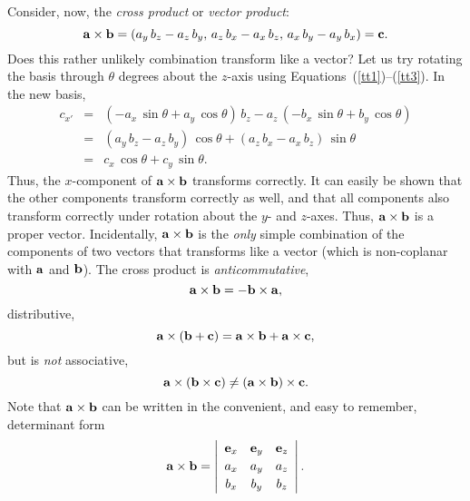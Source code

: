 Consider, now, the {\em cross product} or {\em vector product}:
\begin{equation}
{\bf a}\times{\bf b} = (a_y \, b_z-a_z\, b_y,\, a_z\, b_x - a_x\, b_z,\, a_x\, b_y - a_y\, b_x)
={\bf c}.
\end{equation}
Does this rather unlikely combination transform like a vector? Let us try
rotating the basis through $\theta$ degrees about the $z$-axis using Equations~(\ref{tt1})--(\ref{tt3}).
In the new basis,
\begin{eqnarray}
c_{x'} &= &(-a_x\, \sin\theta + a_y\,\cos\theta)\,b_z - a_z\,(-b_x\, \sin\theta + b_y\,\cos\theta)
\nonumber\\[0.5ex]
&=& (a_y\, b_z - a_z\, b_y)\, \cos\theta + (a_z\, b_x-a_x\, b_z)\,\sin\theta\nonumber\\[0.5ex]
& =& c_x\,\cos\theta
+c_y\,\sin\theta.
\end{eqnarray}
Thus, the $x$-component of ${\bf a}\times{\bf b}$ transforms correctly. It can
easily  be shown that the other components transform correctly as well, and that
all components also transform correctly under rotation about the $y$- and $z$-axes. 
Thus, ${\bf a}\times {\bf b}$ is a proper vector. Incidentally, ${\bf a}\times {\bf b}$
is the {\em only}\/ simple combination of the components of two vectors that transforms
like a vector (which is non-coplanar with ${\bf a}$ and ${\bf b}$).
 The cross product is 
{\em anticommutative},
\begin{equation}
{\bf a}\times{\bf b} = - {\bf b} \times{\bf a},
\end{equation}
distributive,
\begin{equation}
{\bf a}\times({\bf b} +{\bf c})=  {\bf a} \times{\bf b}+{\bf a}\times{\bf c},
\end{equation}
but is {\em not} associative,
\begin{equation}
{\bf a}\times({\bf b} \times{\bf c})\neq ({\bf a}\times{\bf b}) \times{\bf c}.
\end{equation}
Note that ${\bf a}\times {\bf b}$ can be written in the convenient, and easy
to remember, determinant form
\begin{equation}
{\bf a}\times {\bf b} = \left|\begin{array}{ccc}
{\bf e}_x&{\bf e}_y&{\bf e}_z\\[0.5ex]
a_x& a_y& a_z\\[0.5ex]
b_x & b_y & b_z\end{array}\right|.
\end{equation}


